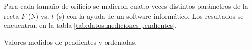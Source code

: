 Para cada tamaño de orificio se midieron cuatro veces distintos parámetros de la
recta $F$ (\si{\newton}) vs. $t$ (\si{\second}) con la ayuda de un software
informático. Los resultados se encuentran en la tabla 
\ref{tab:datos:mediciones-pendientes}.

\begin{table}[H]
    \centering
    \caption{Valores medidos de pendientes y ordenadas.}
    \label{tab:datos:mediciones-pendientes}
\end{table}
